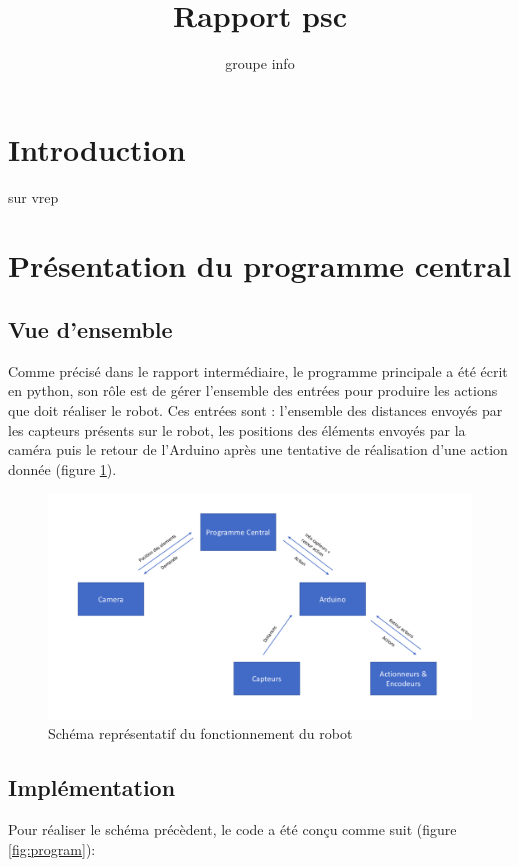 \documentclass{article}
\title{Rapport psc}
\author{groupe info}
\begin{document}
\maketitle

\section{Introduction}

sur vrep

\section{Présentation du programme central}
\subsection{Vue d'ensemble}
Comme précisé dans le rapport intermédiaire, le programme principale a été écrit en python, son rôle est de gérer l'ensemble des entrées pour produire les actions que doit réaliser le robot. Ces entrées sont : l'ensemble des distances envoyés par les capteurs présents sur le robot, les positions des éléments envoyés par la caméra puis le retour de l'Arduino après une tentative de réalisation d'une action donnée (figure \ref{fig:schema}).

\begin{figure}[h!]
\centering
\includegraphics[scale=0.3]{schema}
\caption{Schéma représentatif du fonctionnement du robot}
\label{fig:schema}
\end{figure}


\subsection{Implémentation}

Pour réaliser le schéma précèdent, le code a été conçu comme suit (figure \ref{fig:program}): \\
\end{document}

